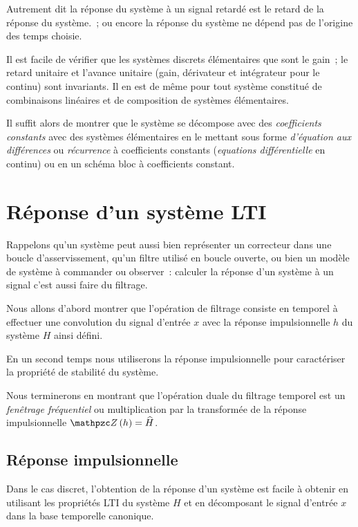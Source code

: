 Autrement dit \og{}la réponse du système à un signal retardé est le
retard de la réponse du système.\fg{}~; ou encore \og{} la réponse du
système ne dépend pas de l'origine des temps choisie.\fg{}



\begin{remarque}
  Il est facile de vérifier que les systèmes discrets élémentaires que
  sont le gain~; le retard unitaire et l'avance unitaire (gain,
  dérivateur et intégrateur pour le continu) sont invariants.  Il en
  est de même pour tout système constitué de combinaisons linéaires
  et de composition de systèmes élémentaires.
  
  Il suffit alors de montrer que le système se décompose avec des
  \emph{coefficients constants} avec des systèmes élémentaires en le
  mettant sous forme \emph{d'équation aux différences} ou
  \emph{récurrence} à coefficients constants (\emph{equations
    différentielle} en continu) ou en un schéma bloc à coefficients
  constant.
\end{remarque}


\section{Réponse d'un système LTI}
Rappelons qu'un système peut aussi bien représenter un correcteur dans
une boucle d'asservissement, qu'un filtre utilisé en boucle ouverte,
ou bien un modèle de système à commander ou observer~: calculer la
réponse d'un système à un signal c'est aussi  \og{}faire du
filtrage.\fg{}

Nous allons d'abord montrer que l'opération de filtrage consiste en
temporel à effectuer une convolution du signal d'entrée $x$ avec la
réponse impulsionnelle $h$ du système $H$ ainsi défini.

En un second temps nous utiliserons la réponse impulsionnelle pour
caractériser la propriété de stabilité du système.

Nous terminerons en montrant que l'opération duale du filtrage
temporel est un \emph{fenêtrage fréquentiel} ou multiplication par la
transformée de la réponse impulsionnelle $\TZ\p{h}=\TZlui{H}$.

\subsection{Réponse impulsionnelle}
Dans le cas discret, l'obtention de la réponse d'un système est facile
à obtenir en utilisant les propriétés LTI du système $H$ et en
décomposant le signal d'entrée $x$ dans la base temporelle canonique.


